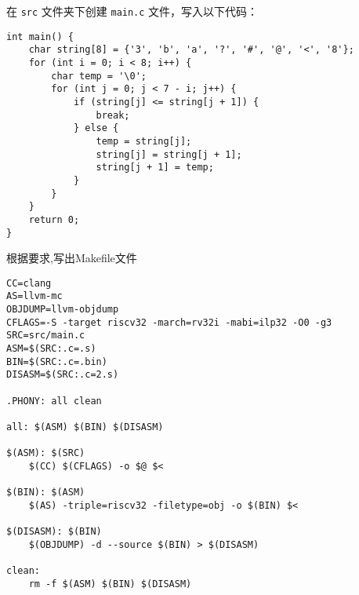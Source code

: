 \documentclass{ctexart}
\begin{document}
在 \texttt{src} 文件夹下创建 \texttt{main.c} 文件，写入以下代码：
\begin{verbatim}
int main() {
    char string[8] = {'3', 'b', 'a', '?', '#', '@', '<', '8'};
    for (int i = 0; i < 8; i++) {
        char temp = '\0';
        for (int j = 0; j < 7 - i; j++) {
            if (string[j] <= string[j + 1]) {
                break;
            } else {
                temp = string[j];
                string[j] = string[j + 1];
                string[j + 1] = temp;
            }
        }
    }
    return 0;
}
\end{verbatim}

根据要求,写出Makefile文件
\begin{verbatim}
CC=clang
AS=llvm-mc
OBJDUMP=llvm-objdump
CFLAGS=-S -target riscv32 -march=rv32i -mabi=ilp32 -O0 -g3
SRC=src/main.c
ASM=$(SRC:.c=.s)
BIN=$(SRC:.c=.bin)
DISASM=$(SRC:.c=2.s)

.PHONY: all clean

all: $(ASM) $(BIN) $(DISASM)

$(ASM): $(SRC)
    $(CC) $(CFLAGS) -o $@ $<

$(BIN): $(ASM)
    $(AS) -triple=riscv32 -filetype=obj -o $(BIN) $<

$(DISASM): $(BIN)
    $(OBJDUMP) -d --source $(BIN) > $(DISASM)

clean:
    rm -f $(ASM) $(BIN) $(DISASM)
\end{verbatim}
\end{document}
